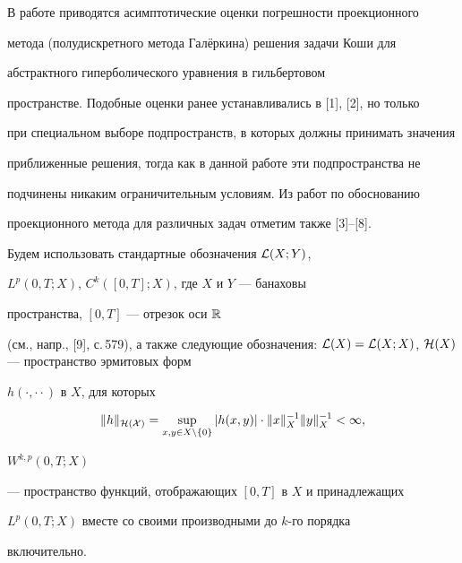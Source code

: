 \maketitle


\label{begin}








В работе приводятся асимптотические оценки погрешности проекционного


метода (полудискретного метода Гал\"еркина) решения задачи Коши для


абстрактного гиперболического уравнения в гильбертовом


пространстве. Подобные оценки ранее устанавливались в [1], [2], но только


при специальном выборе подпространств, в которых должны принимать значения


приближенные решения, тогда как в данной работе эти подпространства не


подчинены никаким ограничительным условиям. Из работ по обоснованию


проекционного метода для различных задач отметим также [3]--[8].





Будем использовать стандартные обозначения ${\cal L}(X;Y)$,


$L^p(0,T;X)$, $C^k([0,T];X)$, где $X$ и $Y$ --- банаховы


пространства, $[0,T]$ --- отрезок оси ${\Bbb R}$


(см., напр., [9], с.\,579), а также следующие обозначения: ${\cal


L}(X) = {\cal L}(X;X)$, ${\cal H}(X)$ --- пространство эрмитовых форм


$h(\cdot ,\cdot \cdot )$ в $X$, для которых


$$


\|h\|_{\cal H(X)} =


\sup_{x,y\in X \backslash \{0\} } |h(x,y)|\cdot \|


x \|^{-1}_{X} \| y \|^{-1}_{X} < \infty,


$$


$W^{k,p}(0,T;X)$


--- пространство функций, отображающих $[0,T]$ в $X$ и принадлежащих


$L^{p}(0,T;X)$ вместе со своими производными до $k$-го порядка


включительно.





